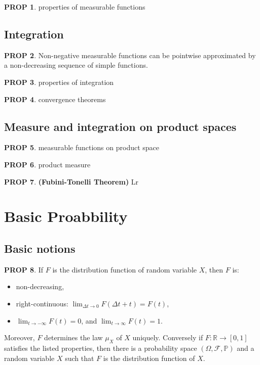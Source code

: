 \documentclass[hidelinks,11pt]{article}
\theoremstyle{definition}
\theoremstyle{dotless}
\newtheorem{prop}{PROP}[section]
\theoremstyle{remark}
\DeclareMathOperator{\1}{\mathbf{1}}
\begin{document}
\begin{prop}
properties of measurable functions
\end{prop}

\subsection{Integration}

\begin{prop}
Non-negative measurable functions can be pointwise approximated by a non-decreasing sequence of simple functions.
\end{prop}

\begin{prop}
properties of integration
\end{prop}

\begin{prop}
convergence theorems
\end{prop}

\subsection{Measure and integration on product spaces}

\begin{prop}
measurable functions on product space
\end{prop}

\begin{prop}
product measure
\end{prop}

\begin{prop}\textup{\textbf{(Fubini-Tonelli Theorem)}} Lr
\end{prop}

\newpage
\section{Basic Proabbility}

\subsection{Basic notions}

\begin{prop}\label{Prop 2.1}
If $F$ is the distribution function of random variable $X$, then $F$ is:\begin{itemize}
    \item non-decreasing,
    \item right-continuous: $\lim_{\Delta t\to0}F(\Delta t+t)=F(t)$,
    \item $\lim_{t\to-\infty}F(t)=0$, and $\lim_{t\to\infty}F(t)=1$.
\end{itemize}
Moreover, $F$ determines the law $\mu_X$ of $X$ uniquely. Conversely if $F:\mathbb{R}\to[0,1]$ satisfies the listed properties, then there is a probability space $(\Omega, \mathcal{F},\mathbb{P})$ and a random variable $X$ such that $F$ is the distribution function of $X$.
\end{prop}
\end{document}

